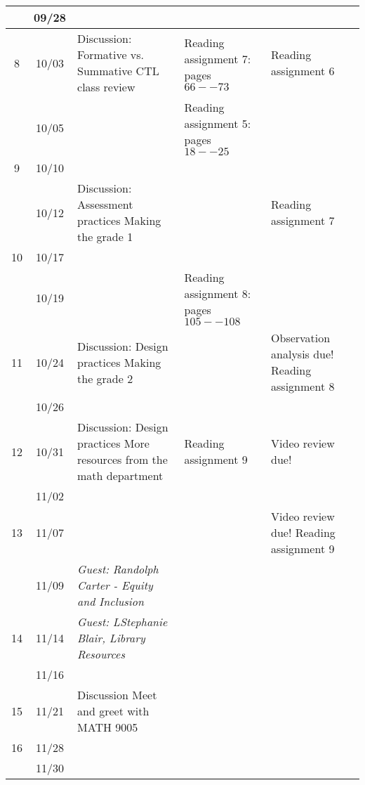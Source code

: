 \begin{longtable}{ |c|c|p{10em}|p{10em}|p{10em}| }
    & 09/28 &  {} & {} & {} \\ \hline

  8 & 10/03 &  {Discussion: Formative vs. Summative CTL class review}  
            & {Reading assignment 7: pages $66--73$} 
            & {Reading assignment 6} \\ \hline

    & 10/05 & {} 
            & {Reading assignment 5: pages $18--25$} & \\ \hline

  9 & 10/10 & 
             &
             & {} \\ \hline

     & 10/12 & {Discussion:  Assessment practices Making the grade 1}   & {}  & {Reading assignment 7} \\ \hline

  10 & 10/17 & {}   & {}  & {} \\ \hline

     & 10/19 & {} 
             & {Reading assignment 8: pages $105--108$}
             & \\ \hline

  11 & 10/24  & {Discussion:  Design practices Making the grade 2} 
              &  
              & {Observation analysis due! Reading assignment 8} \\ \hline

     & 10/26  & {} &  & {} \\ \hline

  12 & 10/31 &  {Discussion: Design practices More resources from the math department} 
             & {Reading assignment 9}  
             & {Video review due!} \\ \hline

     & 11/02 &  {} & {}  & {} \\ \hline

  13 & 11/07 & {} 
             & 
             & {Video review due! Reading assignment 9} \\ \hline %

     & 11/09 & \textit{Guest: Randolph Carter - Equity and Inclusion} %
             & 
             & {} \\ \hline %

  14 & 11/14 & \textit{Guest: LStephanie Blair, Library Resources}  %
             & 
             & {} \\ \hline %


     & 11/16 & {}
             & 
             & \\ \hline

     
  15 & 11/21 & {Discussion Meet and greet with MATH 9005} 
             & 
             & \\ \hline

  16 & 11/28 & {} & & \\ \hline

     & 11/30 &  {} & {}  & {} \\ \hline
\end{longtable}

